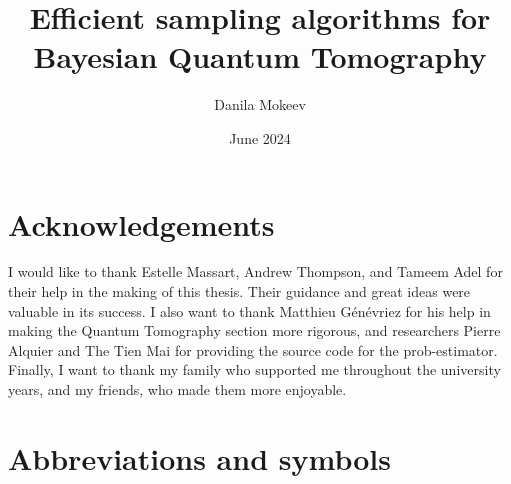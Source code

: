 \documentclass[12pt]{memoir}
\title{Efficient sampling algorithms for Bayesian Quantum Tomography}
\author{Danila Mokeev}
\date{June 2024}
\begin{document}



\chapter*{Acknowledgements}

I would like to thank Estelle Massart, Andrew Thompson, and Tameem Adel for their help in the making of this thesis. Their guidance and great ideas were valuable in its success. I also want to thank Matthieu Génévriez for his help in making the Quantum Tomography section more rigorous, and researchers Pierre Alquier and The Tien Mai for providing the source code for the prob-estimator. Finally, I want to thank my family who supported me throughout the university years, and my friends, who made them more enjoyable.

\newpage


\tableofcontents*


\newpage


\chapter*{Abbreviations and symbols}

\end{document}
